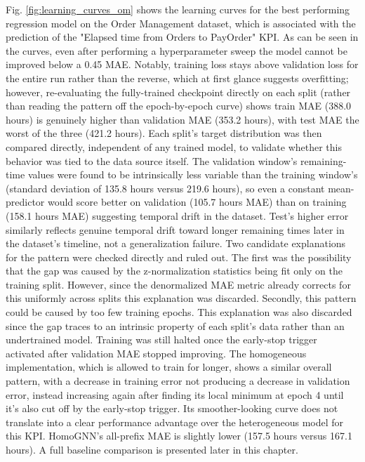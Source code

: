         Fig. \ref{fig:learning_curves_om} shows the learning curves for the best performing regression model on the Order Management dataset, which is associated with the prediction of the "Elapsed time from Orders to PayOrder" KPI. As can be seen in the curves, even after performing a hyperparameter sweep the model cannot be improved below a 0.45 MAE. Notably, training loss stays above validation loss for the entire run rather than the reverse, which at first glance suggests overfitting; however, re-evaluating the fully-trained checkpoint directly on each split (rather than reading the pattern off the epoch-by-epoch curve) shows train MAE (388.0 hours) is genuinely higher than validation MAE (353.2 hours), with test MAE the worst of the three (421.2 hours). 
        Each split's target distribution was then compared directly, independent of any trained model, to validate whether this behavior was tied to the data source itself. The validation window's remaining-time values were found to be intrinsically less variable than the training window's (standard deviation of 135.8 hours versus 219.6 hours), so even a constant mean-predictor would score better on validation (105.7 hours MAE) than on training (158.1 hours MAE) suggesting temporal drift in the dataset.
        Test's higher error similarly reflects genuine temporal drift toward longer remaining times later in the dataset's timeline, not a generalization failure. Two candidate explanations for the pattern were checked directly and ruled out. The first was the possibility that the gap was caused by the z-normalization statistics being fit only on the training split. However, since the denormalized MAE metric already corrects for this uniformly across splits this explanation was discarded. Secondly, this pattern could be caused by too few training epochs. This explanation was also discarded since the gap traces to an intrinsic property of each split's data rather than an undertrained model. Training was still halted once the early-stop trigger activated after validation MAE stopped improving. The homogeneous implementation, which is allowed to train for longer, shows a similar overall pattern, with a decrease in training error not producing a decrease in validation error, instead increasing again after finding its local minimum at epoch 4 until it's also cut off by the early-stop trigger. Its smoother-looking curve does not translate into a clear performance advantage over the heterogeneous model for this KPI. HomoGNN's all-prefix MAE is slightly lower (157.5 hours versus 167.1 hours). A full baseline comparison is presented later in this chapter.

